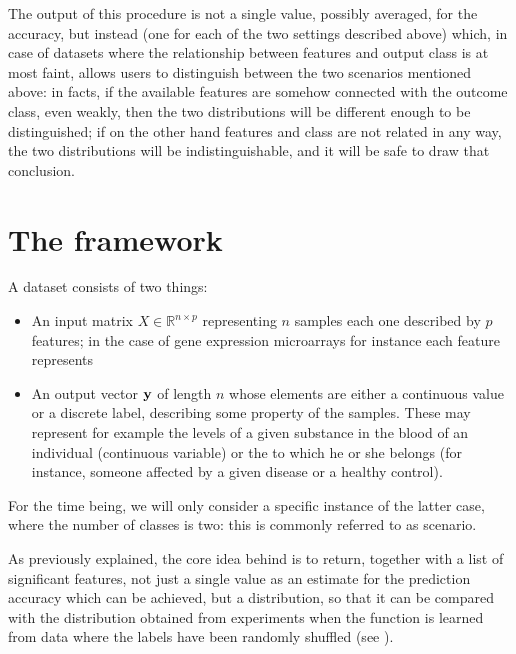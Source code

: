 \documentclass[letterpaper,10pt,english]{sphinxmanual}
\begin{document}
The output of this procedure is not a single value, possibly averaged, for the accuracy, but instead  (one for each of the two settings described above) which, in case of datasets where the relationship between features and output class is at most faint, allows users to distinguish between the two scenarios mentioned above: in facts, if the available features are somehow connected with the outcome class, even weakly, then the two distributions will be  different enough to be distinguished; if on the other hand features and class are not related in any way, the two distributions will be indistinguishable, and it will be safe to draw that conclusion.


\section{The framework}
\label{\detokenize{framework:framework}}\label{\detokenize{framework::doc}}\label{\detokenize{framework:the-framework}}
A dataset consists of two things:
\begin{itemize}
\item {} 
An input matrix \(X \in \mathbb{R}^{n \times p}\) representing \(n\) samples each one described by \(p\) features; in the case of gene expression microarrays for instance each feature represents

\item {} 
An output vector \({\bf y}\) of length \(n\) whose elements are either a continuous value or a discrete label, describing some property of the samples. These may represent for example the levels of a given substance in the blood of an individual (continuous variable) or the  to which he or she belongs (for instance, someone affected by a given disease or a healthy control).

\end{itemize}

For the time being, we will only consider a specific instance of the latter case, where the number of classes is two: this is commonly referred to as  scenario.

As previously explained, the core idea behind  is to return, together with a list of significant features, not just a single value as an estimate for the prediction accuracy which can be achieved, but a distribution, so that it can be compared with the distribution obtained from experiments when the function is learned from data where the labels have been randomly shuffled (see {\hyperref[\detokenize{introduction:introduction}]{}}).
\end{document}
